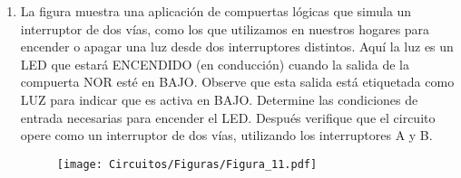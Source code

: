 \documentclass[a4paper, 12pt]{article}
\newcommand{\Aspace}{0.2cm}
\begin{document}
\begin{enumerate}
        \item La figura muestra una aplicación de compuertas lógicas que simula un interruptor de dos vías, como los que utilizamos en nuestros hogares para encender o apagar una luz desde dos interruptores distintos. Aquí la luz es un LED que estará ENCENDIDO (en conducción) cuando la salida de la compuerta NOR esté en BAJO. Observe que esta salida está etiquetada como LUZ para indicar que es activa en BAJO. Determine las condiciones de entrada necesarias para encender el LED. Después verifique que el circuito opere como un interruptor de dos vías, utilizando los interruptores A y B.
        \begin{figure}[!ht]
            \centering
            \texttt{[image: Circuitos/Figuras/Figura\_11.pdf]}
        \end{figure}
            \vspace{\Aspace} \par
            { \color{azul}  }



    \end{enumerate}
\end{document}
